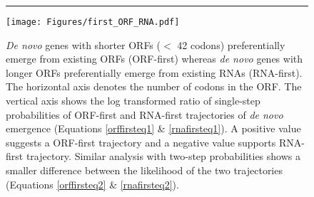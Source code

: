 \documentclass[12pt,a4paper]{article}
\begin{document}
\begin{figure}[!b]
\hrule
\vspace{1ex}
\centering
\texttt{[image: Figures/first\_ORF\_RNA.pdf]}
\caption{\textit{De novo} genes with shorter ORFs ($<$ 42 codons) preferentially emerge from existing ORFs (ORF-first) whereas \textit{de novo} genes with longer ORFs preferentially emerge from existing RNAs (RNA-first). The horizontal axis denotes the number of codons in the ORF. The vertical axis shows the log transformed ratio of single-step probabilities of ORF-first and RNA-first trajectories of \textit{de novo} emergence (Equations \ref{orffirsteq1} \& \ref{rnafirsteq1}). A positive value suggests a ORF-first trajectory and a negative value supports RNA-first trajectory. Similar analysis with two-step probabilities shows a smaller difference between the likelihood of the two trajectories (Equations \ref{orffirsteq2} \& \ref{rnafirsteq2}).}
\label{whoisfirst}
\end{figure}
\end{document}
